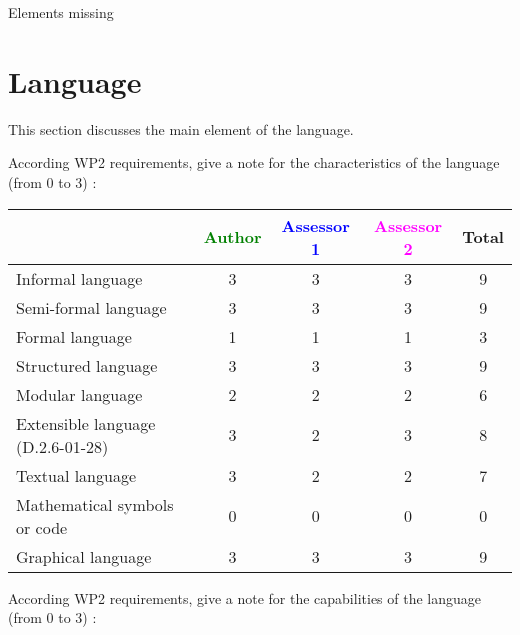 \begin{assessor2}
Elements missing
\end{assessor2}


\section{Language}
This section discusses the main element of the language.

According WP2 requirements, give a note for the characteristics of the language (from 0 to 3) :

\begin{tabular}{|l | c | c | c | c|}
\hline
& \textcolor{green}{Author} & \textcolor{blue}{Assessor 1} & \textcolor{magenta}{Assessor 2} & Total \\
\hline
Informal language & 3 & 3 & 3 & 9 \\
\hline
Semi-formal language & 3 & 3 & 3 & 9 \\
\hline
Formal language & 1 & 1 & 1 & 3 \\
\hline
Structured language & 3 & 3 & 3 & 9 \\
\hline
Modular language & 2 & 2 & 2 & 6 \\
\hline
Extensible language (D.2.6-01-28) & 3 & 2 & 3 & 8  \\
\hline
Textual language & 3 & 2 & 2 & 7 \\
\hline
Mathematical symbols or code & 0 & 0 & 0  & 0 \\
\hline
Graphical language & 3 & 3 & 3 & 9 \\
\hline
\end{tabular}

According WP2 requirements, give a note for the capabilities of the language (from 0 to 3) :

